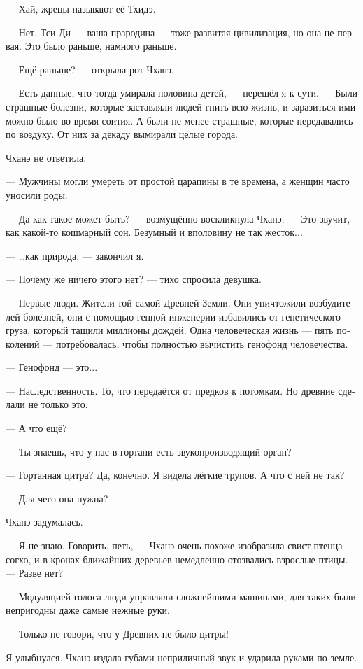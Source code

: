 \documentclass[a4paper,12pt,fleqn]{book}\usepackage{cooltooltips}\usepackage{polyglossia}\setdefaultlanguage[babelshorthands=true]{russian}\setotherlanguage{english}\defaultfontfeatures{Ligatures=TeX,Mapping=tex-text} \usepackage{xcolor}\definecolor{lightgray}{HTML}{bbbbbb}\color{lightgray}\newcommand{\ml}[3]{\textenglish{\textcolor{black}{#3}}}
\begin{document}
{--- Хай, жрецы называют её Тхидэ.

--- Нет.
Тси-Ди --- ваша прародина --- тоже развитая цивилизация, но она не первая.
Это было раньше, намного раньше.

--- Ещё раньше? --- открыла рот Чханэ.

--- Есть данные, что тогда умирала половина детей, --- перешёл я к сути.
--- Были страшные болезни, которые заставляли людей гнить всю жизнь, и заразиться ими можно было во время соития.
А были не менее страшные, которые передавались по воздуху.
От них за декаду вымирали целые города.

Чханэ не ответила.

--- Мужчины могли умереть от простой царапины в те времена, а женщин часто уносили роды.

--- Да как такое может быть? --- возмущённо воскликнула Чханэ.
--- Это звучит, как какой-то кошмарный сон.
Безумный и вполовину не так жесток...

--- \ldots как природа, --- закончил я.

--- Почему же ничего этого нет? --- тихо спросила девушка.

--- Первые люди.
Жители той самой Древней Земли.
Они уничтожили возбудителей болезней, они с помощью генной инженерии избавились от генетического груза, который тащили миллионы дождей.
Одна человеческая жизнь --- пять поколений --- потребовалась, чтобы полностью вычистить генофонд человечества.

--- Генофонд --- это...

--- Наследственность.
То, что передаётся от предков к потомкам.
Но древние сделали не только это.

--- А что ещё?

--- Ты знаешь, что у нас в гортани есть звукопроизводящий орган?

--- Гортанная цитра?
Да, конечно.
Я видела лёгкие трупов.
А что с ней не так?

--- Для чего она нужна?

Чханэ задумалась.

--- Я не знаю.
Говорить, петь, --- Чханэ очень похоже изобразила свист птенца согхо, и в кронах ближайших деревьев немедленно отозвались взрослые птицы.
--- Разве нет?

--- Модуляцией голоса люди управляли сложнейшими машинами, для таких были непригодны даже самые нежные руки.

--- Только не говори, что у Древних не было цитры!

Я улыбнулся.
Чханэ издала губами неприличный звук и ударила руками по земле.

}
\end{document}
